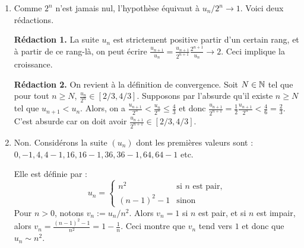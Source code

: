 \documentclass[11pt,a4paper]{article}
\begin{document}
\begin{enumerate}
\item Comme $2^n$ n'est jamais nul, l'hypothèse équivaut à $u_n/2^n \to 1$. Voici deux rédactions.

\textbf{Rédaction 1.} La suite $u_n$ est strictement positive  partir d'un certain rang, et à partir de ce rang-là,  on peut écrire $\frac{u_{n+1}}{u_n} = \frac{u_{n+1}}{2^{n+1}}\frac{2^{n+1}}{u_n} \to 2$. Ceci implique la croissance.

\textbf{Rédaction 2.} On revient à la définition de convergence. 
Soit $N\in\mathbb{N}$ tel que pour tout $n\geq N$, $\frac{u_n}{2^n} \in [2/3,4/3]$.
Supposons par l'absurde qu'il existe $n\geq N$ tel que $u_{n+1}<u_n$.
Alors, on a $\frac{u_{n+1}}{2^n} < \frac{u_n}{2^n} \leq \frac43$ et donc $\frac{u_{n+1}}{2^{n+1}} = \frac12\frac{u_{n+1}}{2^n}   < \frac46 = \frac23$.
C'est absurde car on doit avoir $\frac{u_{n+1}}{2^{n+1}} \in [2/3, 4/3]$.
\item Non. Considérons la suite $(u_n)$ dont les premières valeurs sont : 
$0,-1,4,4-1,16,16-1,36,36-1,64,64-1$ etc.

Elle est définie par :
\[ 
u_n = \begin{cases}
n^2 & \text{si $n$ est pair,}\\
(n-1)^2-1 & \text{sinon}
\end{cases}
\]
Pour $n>0$, notons $v_n := u_n/n^2$. Alors $v_n = 1$ si $n$ est pair, et si $n$ est impair, alors $v_n = \frac{(n-1)^2-1}{n^2} = 1-\frac{1}{n}$. Ceci montre que $v_n$ tend vers $1$ et donc que $u_n \sim n^2$.

\end{enumerate}
\end{document}
